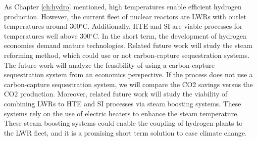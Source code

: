 As Chapter \ref{ch:hydro} mentioned, high temperatures enable efficient hydrogen production.
However, the current fleet of nuclear reactors are LWRs with outlet temperatures around 300$^{\circ}$C.
Additionally, HTE and SI are viable processes for temperatures well above 300$^{\circ}$C.
In the short term, the development of hydrogen economies demand mature technologies.
Related future work will study the steam reforming method, which could use or not carbon-capture sequestration systems.
The future work will analyze the feasibility of using a carbon-capture sequestration system from an economics perspective.
If the process does not use a carbon-capture sequestration system, we will compare the \gls{CO2} savings versus the \gls{CO2} production.
Moreover, related future work will study the viability of combining LWRs to HTE and SI processes via steam boosting systems.
These systems rely on the use of electric heaters to enhance the steam temperature.
These steam boosting systems could enable the coupling of hydrogen plants to the LWR fleet, and it is a promising short term solution to ease climate change.
